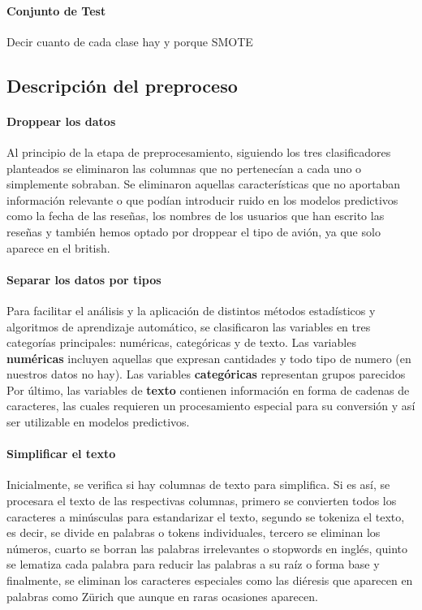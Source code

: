 \documentclass{report}
\begin{document}
            \paragraph*{Conjunto de Test}{ Decir cuanto de cada clase hay y porque SMOTE}
            \subsection{Descripción del preproceso} {
                \paragraph*{Droppear los datos} {
                     Al principio de la etapa de preprocesamiento, siguiendo los tres clasificadores planteados se eliminaron las columnas que no pertenecían a cada uno o simplemente sobraban. Se eliminaron aquellas características que no aportaban información relevante o que podían introducir ruido en los modelos predictivos como la fecha de las reseñas, los nombres de los usuarios que han escrito las reseñas y también hemos optado por droppear el tipo de avión, ya que solo aparece en el british.}
                \paragraph*{Separar los datos por tipos} {
                    Para facilitar el análisis y la aplicación de distintos métodos estadísticos y algoritmos de aprendizaje automático, se clasificaron las variables en tres categorías principales: numéricas, categóricas y de texto. Las variables \textbf{numéricas} incluyen aquellas que expresan cantidades y todo tipo de numero (en nuestros datos no hay). Las variables \textbf{categóricas} representan grupos parecidos Por último, las variables de \textbf{texto} contienen información en forma de cadenas de caracteres, las cuales requieren un procesamiento especial para su conversión y así ser utilizable en modelos predictivos. }
                \paragraph*{Simplificar el texto} {
                    Inicialmente, se verifica si hay columnas de texto para simplifica. Si es así, se procesara el texto de las respectivas columnas, primero se convierten todos los caracteres a minúsculas para estandarizar el texto, segundo se tokeniza el texto, es decir, se divide en palabras o tokens individuales, tercero se eliminan los números, cuarto se borran las palabras irrelevantes o stopwords en inglés, quinto se lematiza cada palabra para reducir las palabras a su raíz o forma base y finalmente, se eliminan los caracteres especiales como las diéresis que aparecen en palabras como Zürich que aunque en raras ocasiones aparecen. }
}
\end{document}
